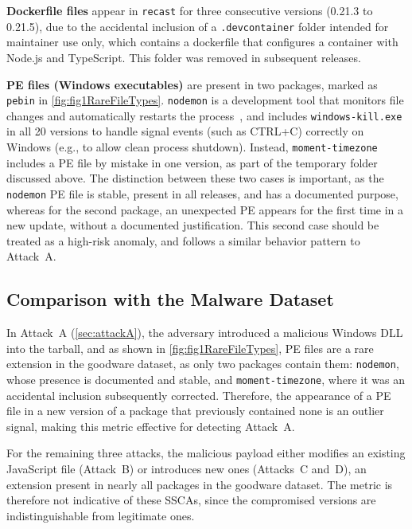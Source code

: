 \textbf{Dockerfile files} appear in \texttt{recast} for three consecutive versions (0.21.3 to 0.21.5),
due to the accidental inclusion of a \texttt{.devcontainer} folder intended for maintainer use only,
which contains a dockerfile that configures a container with Node.js and TypeScript.
This folder was removed in subsequent releases.

\textbf{PE files (Windows executables)} are present in two packages, marked as \texttt{pebin} in \cref{fig:fig1RareFileTypes}.
\texttt{nodemon} is a development tool that monitors file changes and automatically restarts the process~\cite{nodemon},
and includes \texttt{windows-kill.exe} in all 20 versions to handle signal events (such as CTRL+C) 
correctly on Windows (e.g., to allow clean process shutdown).
Instead, \texttt{moment-timezone} includes a \ac{PE} file by mistake in one version,
as part of the temporary folder discussed above.
The distinction between these two cases is important, 
as the \texttt{nodemon} \ac{PE} file is stable, present in all releases, and has a documented purpose,
whereas for the second package, an unexpected \ac{PE} appears for the first time in a new update, without a documented justification. 
This second case should be treated as a high-risk anomaly, and follows a similar behavior pattern to Attack~A.

\subsection{Comparison with the Malware Dataset}
\label{subsec:analysisFileTypesComparisonMalware}

In Attack~A (\cref{sec:attackA}), the adversary introduced a malicious Windows \ac{DLL} into the tarball, 
and as shown in \cref{fig:fig1RareFileTypes}, \ac{PE} files are a rare extension in the goodware dataset, 
as only two packages contain them: \texttt{nodemon}, whose presence is documented and stable, 
and \texttt{moment-timezone}, where it was an accidental inclusion subsequently corrected.
Therefore, the appearance of a \ac{PE} file in a new version of a package that previously contained none is an outlier signal, 
making this metric effective for detecting Attack~A.

For the remaining three attacks, the malicious payload either modifies an existing JavaScript file (Attack~B) or introduces new ones (Attacks~C and~D),
an extension present in nearly all packages in the goodware dataset.
The metric is therefore not indicative of these \acp{SSCA},
since the compromised versions are indistinguishable from legitimate ones.